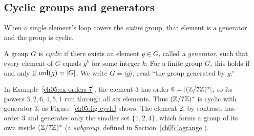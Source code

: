 \subsection{Cyclic groups and generators}

When a single element's loop covers the \emph{entire} group, that element is a generator
and the group is cyclic.

\begin{definition}
\label{ch05:def-cyclic}
A group $G$ is \emph{cyclic} if there exists an element $g \in G$, called a \emph{generator}, such that
every element of $G$ equals $g^k$ for some integer $k$. For a finite group $G$, this holds if and only if $\operatorname{ord}(g) = \lvert G\rvert$.
We write $G = \langle g \rangle$, read ``the group generated by $g$.''
\end{definition}

In Example~\ref{ch05:ex-orders-7}, the element $3$ has order $6 = \lvert(\mathbb{Z}/7\mathbb{Z})^{*}\rvert$, so its
powers $3,2,6,4,5,1$ run through all six elements. Thus $(\mathbb{Z}/7\mathbb{Z})^{*}$ is cyclic with generator
$3$, as Figure~\ref{ch05:fig-cycle} shows. The element $2$, by contrast, has order $3$ and
generates only the smaller set $\{1,2,4\}$, which forms a group of its own inside $(\mathbb{Z}/7\mathbb{Z})^{*}$ (a \emph{subgroup}, defined in Section~\ref{ch05:lagrange}).

